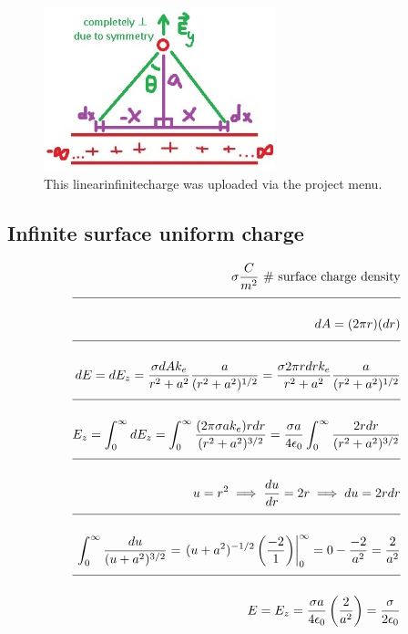 \documentclass[a4paper]{article}
\newcommand{\eqComment}[1]{\text{  \# #1}}
\newcommand{\n}{\\[1.5ex] \hline \nonumber \\[0ex]}
\begin{document}
\begin{figure}[h]
\centering
\includegraphics[width=0.6\textwidth]{figures/linearinfinitecharge.jpg}
\caption{\label{fig:linearinfinitecharge}This linearinfinitecharge was uploaded via the project menu.}
\end{figure} \FloatBarrier

\subsection{Infinite surface uniform charge}
\begin{tcolorbox}
\begin{align}
   \sigma \frac{C}{m^2} \eqComment{surface charge density}
\n dA = (2 \pi r) (dr)
\n dE = dE_z = \frac{\sigma dA k_e}{r^2 + a^2} \frac{a}{(r^2 + a^2)^{1/2}} = \frac{\sigma 2 \pi r dr k_e}{r^2 + a^2} \frac{a}{(r^2 + a^2)^{1/2}}
\n E_z = \int_0^\infty dE_z = \int_0^\infty \frac{(2 \pi \sigma a k_e) r dr}{(r^2 + a^2)^{3/2}} = \frac{\sigma a}{4 \epsilon_0} \int_0^\infty \frac{2 r dr}{(r^2 + a^2)^{3/2}}
\n u = r^2 \implies \frac{du}{dr} = 2 r \implies du = 2 r dr
\n \int_0^\infty \frac{du}{(u + a^2)^{3/2}} = \left.(u + a^2)^{-1/2} \left(\frac{-2}{1}\right)\right|_0^\infty = 0 - \frac{-2}{a^2} = \frac{2}{a^2}
\n E = E_z = \frac{\sigma a}{4 \epsilon_0} \left(\frac{2}{a^2}\right) = \frac{\sigma}{2 \epsilon_0}
\end{align}
\end{tcolorbox}
\end{document}
